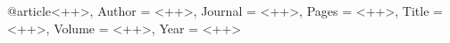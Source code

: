 
@article{<++>,
    Author = {<++>},
    Journal = {<++>},
    Pages = {<++>},
    Title = {<++>},
    Volume = {<++>},
    Year = {<++>}}

